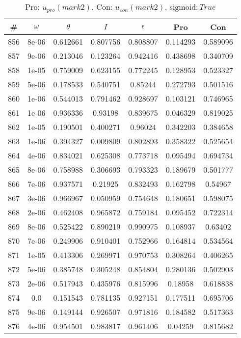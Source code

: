 \newpage
\begin{table}
\caption{Pro: $u_{pro} (mark 2)$, Con: $u_{con} (mark 2)$, $\mathrm{sigmoid}: True$}
\begin{tabular*}{\linewidth}{c|c|c|c|c|c|c}
\# & $\omega$ & $\theta$ & $I$ & $\epsilon$ & Pro & Con \\
\hline
856 & 8e-06 & 0.612661 & 0.807756 & 0.808807 & 0.114293 & 0.589096\\
857 & 9e-06 & 0.213046 & 0.123264 & 0.942416 & 0.438698 & 0.340709\\
858 & 1e-05 & 0.759009 & 0.623155 & 0.772245 & 0.128953 & 0.523327\\
859 & 5e-06 & 0.178533 & 0.540751 & 0.85244 & 0.272793 & 0.501516\\
860 & 1e-06 & 0.544013 & 0.791462 & 0.928697 & 0.103121 & 0.746965\\
861 & 1e-06 & 0.936336 & 0.93198 & 0.839675 & 0.046329 & 0.819025\\
862 & 1e-05 & 0.190501 & 0.400271 & 0.96024 & 0.342203 & 0.384658\\
863 & 1e-06 & 0.394327 & 0.009809 & 0.802893 & 0.358322 & 0.525654\\
864 & 4e-06 & 0.834021 & 0.625308 & 0.773718 & 0.095494 & 0.694734\\
865 & 8e-06 & 0.758988 & 0.306693 & 0.793323 & 0.189679 & 0.501777\\
866 & 7e-06 & 0.937571 & 0.21925 & 0.832493 & 0.162798 & 0.54967\\
867 & 3e-06 & 0.966967 & 0.050959 & 0.754648 & 0.180651 & 0.598075\\
868 & 2e-06 & 0.462408 & 0.965872 & 0.759184 & 0.095452 & 0.722314\\
869 & 8e-06 & 0.525422 & 0.890219 & 0.990975 & 0.108937 & 0.63402\\
870 & 7e-06 & 0.249906 & 0.910401 & 0.752966 & 0.164814 & 0.534564\\
871 & 1e-05 & 0.413306 & 0.269971 & 0.970753 & 0.308264 & 0.406265\\
872 & 5e-06 & 0.385748 & 0.305248 & 0.854804 & 0.280136 & 0.502903\\
873 & 2e-06 & 0.517943 & 0.435976 & 0.815996 & 0.18958 & 0.618838\\
874 & 0.0 & 0.151543 & 0.781135 & 0.927151 & 0.177511 & 0.695706\\
875 & 9e-06 & 0.149144 & 0.926507 & 0.971816 & 0.184582 & 0.517363\\
876 & 4e-06 & 0.954501 & 0.983817 & 0.961406 & 0.04259 & 0.815682\\

\end{tabular*}
\end{table}
